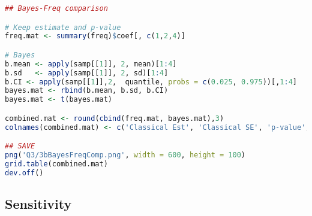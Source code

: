 \documentclass{article}
\begin{document}
\begin{lstlisting}[language=R]
## Bayes-Freq comparison

# Keep estimate and p-value
freq.mat <- summary(freq)$coef[, c(1,2,4)]

# Bayes
b.mean <- apply(samp[[1]], 2, mean)[1:4]
b.sd   <- apply(samp[[1]], 2, sd)[1:4]
b.CI <- apply(samp[[1]],2,  quantile, probs = c(0.025, 0.975))[,1:4]
bayes.mat <- rbind(b.mean, b.sd, b.CI)
bayes.mat <- t(bayes.mat)

combined.mat <- round(cbind(freq.mat, bayes.mat),3)
colnames(combined.mat) <- c('Classical Est', 'Classical SE', 'p-value', 'Bayes Mean', 'Bayes SD', 'Bayes 2.5%', 'Bayes 97.5%')

## SAVE
png('Q3/3bBayesFreqComp.png', width = 600, height = 100)
grid.table(combined.mat)
dev.off()

\end{lstlisting}
\subsection{Sensitivity} \label{appA3c}
\end{document}
